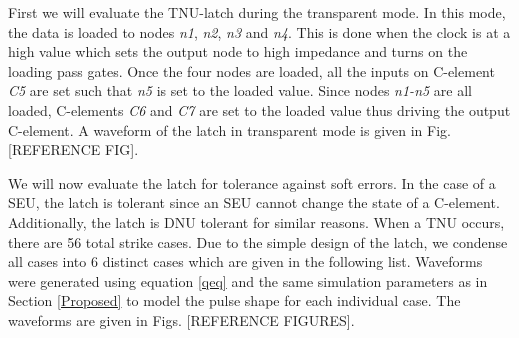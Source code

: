 First we will evaluate the TNU-latch during the transparent mode. In this mode, the data is loaded to nodes \textit{n1}, \textit{n2}, \textit{n3} and \textit{n4}. This is done when the clock is at a high value which sets the output node to high impedance and turns on the loading pass gates. Once the four nodes are loaded, all the inputs on C-element \textit{C5} are set such that \textit{n5} is set to the loaded value. Since nodes \textit{n1-n5} are all loaded, C-elements \textit{C6} and \textit{C7} are set to the loaded value thus driving the output C-element. A waveform of the latch in transparent mode is given in Fig. [REFERENCE FIG].

We will now evaluate the latch for tolerance against soft errors. In the case of a SEU, the latch is tolerant since an SEU cannot change the state of a C-element. Additionally, the latch is DNU tolerant for similar reasons. When a TNU occurs, there are 56 total strike cases. Due to the simple design of the latch, we condense all cases into 6 distinct cases which are given in the following list. Waveforms were generated using equation \ref{qeq} and the same simulation parameters as in Section \ref{Proposed} to model the pulse shape for each individual case. The waveforms are given in Figs. [REFERENCE FIGURES].

